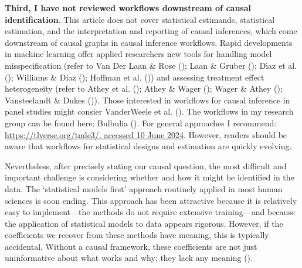 \documentclass[
  single column]{article}
\begin{document}
\textbf{Third, I have not reviewed workflows downstream of causal
identification}. This article does not cover statistical estimands,
statistical estimation, and the interpretation and reporting of causal
inferences, which come downstream of causal graphs in causal inference
workflows. Rapid developments in machine learning offer applied
researchers new tools for handling model misspecification (refer to Van
Der Laan \& Rose (); Laan \& Gruber
(); Dı́az et al.
(); Williams \& Díaz
(); Hoffman et al.
()) and assessing treatment effect
heterogeneity (refer to Athey et al. ();
Athey \& Wager (); Wager \& Athey
(); Vansteelandt \& Dukes
()). Those interested in workflows
for causal inference in panel studies might consier VanderWeele et al.
(). The workflows in my research
group can be found here: Bulbulia
(). For general approaches I
recommend: \href{https://tlverse.org/tmle3/}{https://tlverse.org/tmle3/,
accessed 10 June 2024}. However, readers should be aware that workflows
for statistical designs and estimation are quickly evolving.

Nevertheless, after precisely stating our causal question, the most
difficult and important challenge is considering whether and how it
might be identified in the data. The `statistical models first' approach
routinely applied in most human sciences is soon ending. This approach
has been attractive because it is relatively easy to implement---the
methods do not require extensive training---and because the application
of statistical models to data appears rigorous. However, if the
coefficients we recover from these methods have meaning, this is
typically accidental. Without a causal framework, these coefficients are
not just uninformative about what works and why; they lack any meaning
().
\end{document}
